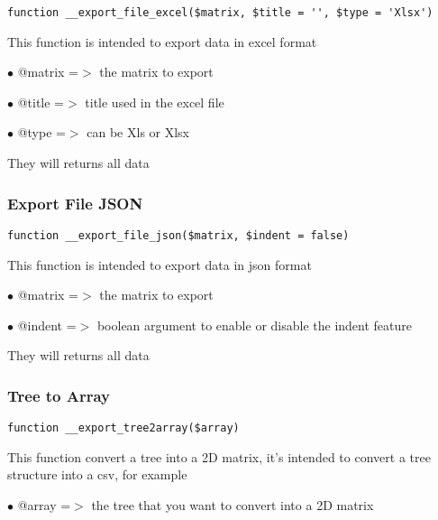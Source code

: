 \documentclass[a4paper]{article}
\begin{document}
\begin{lstlisting}
function __export_file_excel($matrix, $title = '', $type = 'Xlsx')
\end{lstlisting}

This function is intended to export data in excel format

\begin{compactitem}
\item[\color{myblue}$\bullet$] @matrix =$>$ the matrix to export
\item[\color{myblue}$\bullet$] @title  =$>$ title used in the excel file
\item[\color{myblue}$\bullet$] @type   =$>$ can be Xls or Xlsx
\end{compactitem}

They will returns all data

\hypertarget{toc442}{}
\subsubsection{Export File JSON}

\begin{lstlisting}
function __export_file_json($matrix, $indent = false)
\end{lstlisting}

This function is intended to export data in json format

\begin{compactitem}
\item[\color{myblue}$\bullet$] @matrix =$>$ the matrix to export
\item[\color{myblue}$\bullet$] @indent =$>$ boolean argument to enable or disable the indent feature
\end{compactitem}

They will returns all data

\hypertarget{toc443}{}
\subsubsection{Tree to Array}

\begin{lstlisting}
function __export_tree2array($array)
\end{lstlisting}

This function convert a tree into a 2D matrix, it's intended to convert
a tree structure into a csv, for example

\begin{compactitem}
\item[\color{myblue}$\bullet$] @array =$>$ the tree that you want to convert into a 2D matrix
\end{compactitem}
\end{document}
